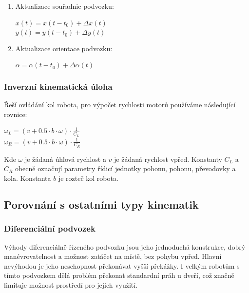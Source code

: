 \begin{enumerate}
\begin{center}
          \end{center}
    \item Aktualizace souřadnic podvozku:
          \begin{center}
              \(x(t) = x(t-t_0) + \Delta x(t)\)\\
              \(y(t) = y(t-t_0) + \Delta y(t)\)
          \end{center}
    \item Aktualizace orientace podvozku:
          \begin{center}
              \(\alpha = \alpha(t-t_0) + \Delta \alpha(t)\)
          \end{center}
\end{enumerate}

\subsubsection{Inverzní kinematická úloha}
Řeší ovládání kol robota, pro výpočet rychlosti motorů používáme následující rovnice:\\
\begin{center}
    \(\omega_{L} = (v + 0.5\cdot b \cdot \omega)\cdot \frac{1}{C_L}\)\\
    \(\omega_{R} = (v + 0.5\cdot b \cdot \omega)\cdot \frac{1}{C_R}\)
\end{center}
Kde \(\omega \) je žádaná úhlová rychlost a \(v\) je žádaná rychlost vpřed. Konstanty \(C_L\) a \(C_R\) obecně označují parametry řídicí jednotky pohonu, pohonu, převodovky a kola. Konstanta \(b\) je rozteč kol robota.\\

\subsection{Porovnání s ostatními typy kinematik}
\subsubsection{Diferenciální podvozek}
Výhody diferenciálně řízeného podvozku jsou jeho jednoduchá konstrukce, dobrý manévrovatelnost a možnost zatáčet na místě, bez pohybu vpřed.
Hlavní nevýhodou je jeho neschopnost překonávat vyšší překážky. I velkým robotům s tímto podvozkem dělá problém překonat standardní práh u dveří, což značně limituje možnost prostředí pro jejich využití. \\
